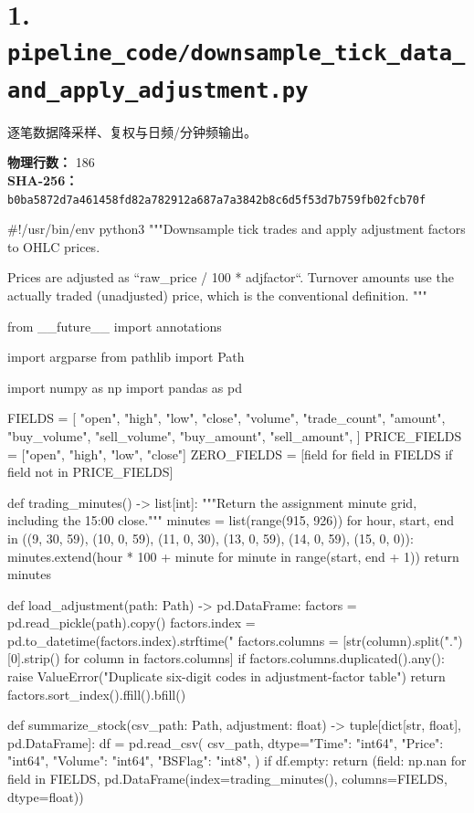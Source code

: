 \documentclass[UTF8,a4paper,fontset=fandol]{ctexart}
\begin{document}
\section{1. \texttt{pipeline\_code/downsample\_tick\_data\_and\_apply\_adjustment.py}}
逐笔数据降采样、复权与日频/分钟频输出。

\textbf{物理行数：} 186\\
\textbf{SHA-256：} \texttt{b0ba5872d7a461458fd82a782912a687a7a3842b8c6d5f53d7b759fb02fcb70f}

\begin{ProjectCode}
#!/usr/bin/env python3
"""Downsample tick trades and apply adjustment factors to OHLC prices.

Prices are adjusted as ``raw_price / 100 * adjfactor``.  Turnover amounts use
the actually traded (unadjusted) price, which is the conventional definition.
"""

from __future__ import annotations

import argparse
from pathlib import Path

import numpy as np
import pandas as pd


FIELDS = [
    "open", "high", "low", "close", "volume", "trade_count", "amount",
    "buy_volume", "sell_volume", "buy_amount", "sell_amount",
]
PRICE_FIELDS = ["open", "high", "low", "close"]
ZERO_FIELDS = [field for field in FIELDS if field not in PRICE_FIELDS]


def trading_minutes() -> list[int]:
    """Return the assignment minute grid, including the 15:00 close."""
    minutes = list(range(915, 926))
    for hour, start, end in ((9, 30, 59), (10, 0, 59), (11, 0, 30),
                             (13, 0, 59), (14, 0, 59), (15, 0, 0)):
        minutes.extend(hour * 100 + minute for minute in range(start, end + 1))
    return minutes


def load_adjustment(path: Path) -> pd.DataFrame:
    factors = pd.read_pickle(path).copy()
    factors.index = pd.to_datetime(factors.index).strftime("%
    factors.columns = [str(column).split(".")[0].strip() for column in factors.columns]
    if factors.columns.duplicated().any():
        raise ValueError("Duplicate six-digit codes in adjustment-factor table")
    return factors.sort_index().ffill().bfill()


def summarize_stock(csv_path: Path, adjustment: float) -> tuple[dict[str, float], pd.DataFrame]:
    df = pd.read_csv(
        csv_path,
        dtype={"Time": "int64", "Price": "int64", "Volume": "int64", "BSFlag": "int8"},
    )
    if df.empty:
        return ({field: np.nan for field in FIELDS},
                pd.DataFrame(index=trading_minutes(), columns=FIELDS, dtype=float))


\end{ProjectCode}
\end{document}
